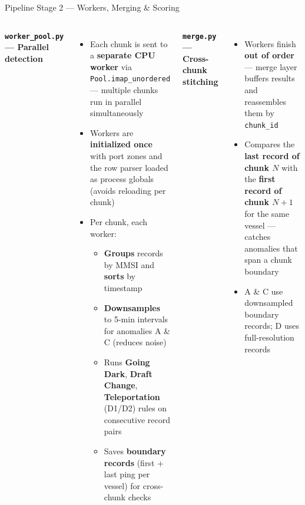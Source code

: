 \documentclass[svgnames, 9pt]{beamer}
\begin{document}
\begin{frame}{Pipeline Stage 2 — Workers, Merging \& Scoring}
    \footnotesize

    \begin{columns}[T]

        {\scriptsize\color{maincolor}\textbf{\texttt{worker\_pool.py} — Parallel detection}}
        \vspace{0.1em}
        \begin{itemize}\scriptsize
            \item Each chunk is sent to a \textbf{separate CPU worker} via
                  \texttt{Pool.imap\_unordered} — multiple chunks run in
                  parallel simultaneously
            \item Workers are \textbf{initialized once} with port zones and
                  the row parser loaded as process globals (avoids reloading
                  per chunk)
            \item Per chunk, each worker:
            \begin{itemize}\scriptsize
                \item[\color{accentred}$\bullet$] \textbf{Groups} records by
                      MMSI and \textbf{sorts} by timestamp
                \item[\color{accentred}$\bullet$] \textbf{Downsamples} to
                      5-min intervals for anomalies A \& C (reduces noise)
                \item[\color{accentred}$\bullet$] Runs \textbf{Going Dark},
                      \textbf{Draft Change}, \textbf{Teleportation} (D1/D2)
                      rules on consecutive record pairs
                \item[\color{accentred}$\bullet$] Saves \textbf{boundary
                      records} (first + last ping per vessel) for cross-chunk
                      checks
            \end{itemize}
        \end{itemize}

        {\scriptsize\color{maincolor}\textbf{\texttt{merge.py} — Cross-chunk stitching}}
        \vspace{0.1em}
        \begin{itemize}\scriptsize
            \item Workers finish \textbf{out of order} — merge layer buffers
                  results and reassembles them by \texttt{chunk\_id}
            \item Compares the \textbf{last record of chunk $N$} with the
                  \textbf{first record of chunk $N\!+\!1$} for the same
                  vessel — catches anomalies that span a chunk boundary
            \item A \& C use downsampled boundary records; D uses
                  full-resolution records
        \end{itemize}


\end{columns}
\end{frame}
\end{document}
